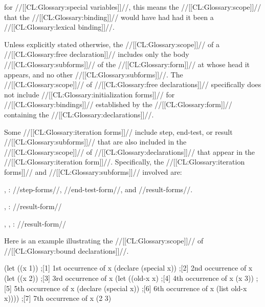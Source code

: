 for //[[CL:Glossary:special variables]]//,
this means the //[[CL:Glossary:scope]]// that the //[[CL:Glossary:binding]]// 
would have had had it been a //[[CL:Glossary:lexical binding]]//.

Unless explicitly stated otherwise, the //[[CL:Glossary:scope]]// of a 
//[[CL:Glossary:free declaration]]// includes only the body //[[CL:Glossary:subforms]]// of 
the //[[CL:Glossary:form]]// at whose head it appears, and no other //[[CL:Glossary:subforms]]//.
The //[[CL:Glossary:scope]]// of //[[CL:Glossary:free declarations]]// specifically does not
include //[[CL:Glossary:initialization forms]]// for //[[CL:Glossary:bindings]]// established
by the //[[CL:Glossary:form]]// containing the //[[CL:Glossary:declarations]]//.

Some //[[CL:Glossary:iteration forms]]// include step, end-test, or result 
//[[CL:Glossary:subforms]]// that are also included in the //[[CL:Glossary:scope]]//
of //[[CL:Glossary:declarations]]// that appear in the //[[CL:Glossary:iteration form]]//.
Specifically, the //[[CL:Glossary:iteration forms]]// and //[[CL:Glossary:subforms]]// involved
are:

\beginlist
\item{\bull} , :  
  //step-forms//, //end-test-form//, and //result-forms//.
\item{\bull} , :
  //result-form//
\item{\bull} , , :
  //result-form//
\endlist




Here is an example illustrating the //[[CL:Glossary:scope]]// of //[[CL:Glossary:bound declarations]]//.

\code
 (let ((x 1))                ;[1] 1st occurrence of x
   (declare (special x))     ;[2] 2nd occurrence of x
   (let ((x 2))              ;[3] 3rd occurrence of x
     (let ((old-x x)         ;[4] 4th occurrence of x
           (x 3))            ;[5] 5th occurrence of x
       (declare (special x)) ;[6] 6th occurrence of x
       (list old-x x))))     ;[7] 7th occurrence of x
\EV (2 3)
\endcode

